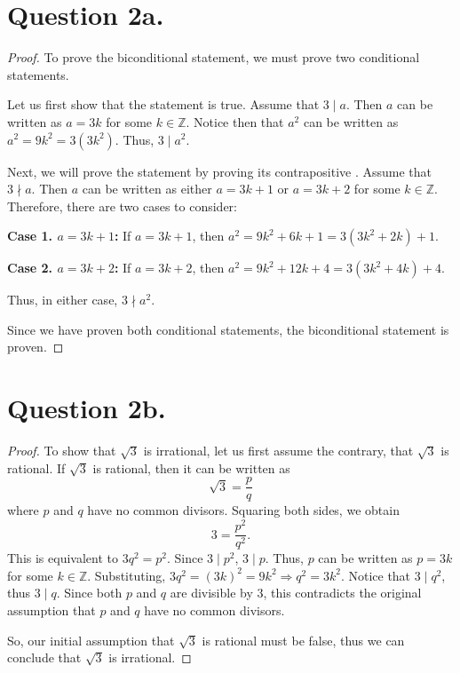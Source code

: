 \documentclass{article}
\begin{document}
\section*{Question 2a.}
\begin{proof}
    To prove the biconditional statement, we must prove two conditional statements.

    \noindent Let us first show that the statement  is true. Assume that $ 3 \mid a $. Then $ a $ can be written as $ a = 3k $ for some $ k \in \mathbb{Z} $. Notice then that $ a^2 $ can be written as $ a^2 = 9k^2 = 3(3k^2) $. Thus, $ 3 \mid a^2 $.

    \noindent Next, we will prove the statement  by proving its contrapositive . Assume that $ 3 \nmid a $. Then $ a $ can be written as either $ a = 3k + 1 $ or $ a = 3k + 2 $ for some $ k \in \mathbb{Z} $. Therefore, there are two cases to consider:

    \noindent \textbf{Case 1. $ a = 3k + 1 $:} If $ a = 3k + 1 $, then $ a^2 = 9k^2 + 6k + 1 = 3(3k^2 + 2k) + 1 $.

    \noindent \textbf{Case 2. $ a = 3k + 2 $:} If $ a = 3k + 2 $, then $ a^2 = 9k^2 + 12k + 4 = 3(3k^2 + 4k) + 4 $.

    \noindent Thus, in either case, $ 3 \nmid a^2 $.

    \noindent Since we have proven both conditional statements, the biconditional statement is proven.
\end{proof}

\section*{Question 2b.}
\begin{proof}
    To show that $ \sqrt{3} $ is irrational, let us first assume the contrary, that $ \sqrt{3} $ is rational. If $ \sqrt{3} $ is rational, then it can be written as 
    \[ \sqrt{3} = \frac{p}{q} \]
    where $ p $ and $ q $ have no common divisors. Squaring both sides, we obtain
    \[ 3 = \frac{p^2}{q^2}. \] 
    This is equivalent to $ 3q^2 = p^2 $. Since $ 3 \mid p^2 $, $ 3 \mid p $. Thus, $ p $ can be written as $ p = 3k $ for some $ k \in \mathbb{Z} $. Substituting, $ 3q^2 = (3k)^2 = 9k^2 \Rightarrow q^2 = 3k^2 $. Notice that $ 3 \mid q^2 $, thus $ 3 \mid q $.
    Since both $ p $ and $ q $ are divisible by $ 3 $, this contradicts the original assumption that $ p $ and $ q $ have no common divisors.

    \noindent So, our initial assumption that $ \sqrt{3} $ is rational must be false, thus we can conclude that $ \sqrt{3} $ is irrational.
\end{proof}
\end{document}
